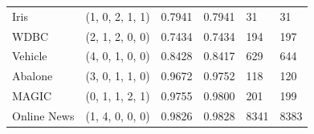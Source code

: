 \begin{tabular}{llllll}
Iris & (1, 0, 2, 1, 1) & 0.7941 & 0.7941 & 31 & 31 \\
WDBC & (2, 1, 2, 0, 0) & 0.7434 & 0.7434 & 194 & 197 \\
Vehicle & (4, 0, 1, 0, 0) & 0.8428 & 0.8417 & 629 & 644 \\
Abalone & (3, 0, 1, 1, 0) & 0.9672 & 0.9752 & 118 & 120 \\
MAGIC & (0, 1, 1, 2, 1) & 0.9755 & 0.9800 & 201 & 199 \\
Online News & (1, 4, 0, 0, 0) & 0.9826 & 0.9828 & 8341 & 8383 \\
\end{tabular}
